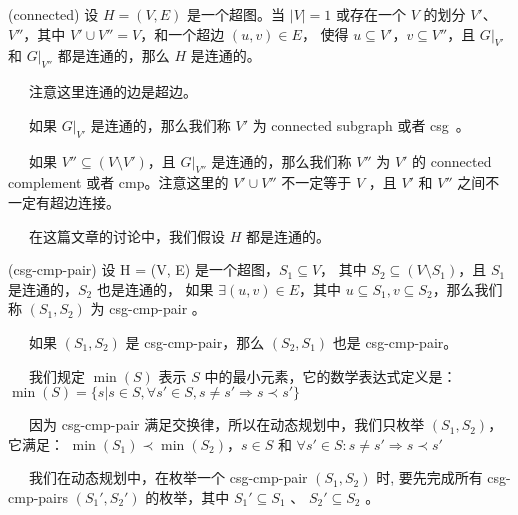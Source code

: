 \documentclass[fontset=none]{ctexart}
\begin{document}
\begin{definition}{(connected)}
    设 $H = (V, E)$ 是一个超图。当 $|V| = 1$ 或存在一个 $V$ 的划分 $V'$、$V''$，其中 $V' \cup V'' = V$，和一个超边 $(u, v) \in E$，
    使得 $u \subseteq V'$，$v \subseteq V''$，且 $G|_{V'}$ 和 $G|_{V''}$ 都是连通的，那么 $H$ 是连通的。

    \ \ \ 注意这里连通的边是超边。

    \ \ \ 如果 $G|_{V'}$ 是连通的，那么我们称 $V'$ 为 connected subgraph 或者 csg\ 。

    \ \ \ 如果 $V'' \subseteq (V \setminus V')$，且 $G|_{V''}$ 是连通的，那么我们称 $V''$ 为 $V'$ 的 connected complement 或者 cmp。注意这里的 $V' \cup V''$ 不一定等于 $V$ ，且 $V'$ 和 $V''$ 之间不一定有超边连接。

    \ \ \ 在这篇文章的讨论中，我们假设 $H$ 都是连通的。
\end{definition}

\begin{definition}{(csg-cmp-pair)}
    设 H = (V, E) 是一个超图，$S_{1} \subseteq V$， 其中 $S_{2} \subseteq (V \setminus S_{1})$，且 $S_{1}$ 是连通的，$S_{2}$ 也是连通的，
    如果 $\exists (u,v) \in E$，其中 $u \subseteq S_{1},v \subseteq S_{2}$，那么我们称 $(S_{1},S_{2})$ 为 csg-cmp-pair 。

    \ \ \ 如果 $(S_{1},S_{2})$ 是 csg-cmp-pair，那么 $(S_{2},S_{1})$ 也是 csg-cmp-pair。
    
    \ \ \ 我们规定 $\min(S)$ 表示 $S$ 中的最小元素，它的数学表达式定义是：$\min(S) = \{s | s \in S, \forall s' \in S, s \neq s' \Rightarrow s \prec s'\}$

    
    \ \ \ 因为 csg-cmp-pair 满足交换律，所以在动态规划中，我们只枚举 $(S_{1},S_{2})$，它满足：
    $\min(S_{1}) \prec \min(S_{2})$，$s \in S \text{ 和 } \forall s' \in S : s \neq s' \Rightarrow s \prec s'$

    \ \ \ 我们在动态规划中，在枚举一个 csg-cmp-pair $(S_{1},S_{2})$ 时, 要先完成所有 csg-cmp-pairs $(S_{1}',S_{2}')$ 的枚举，其中 $S_{1}' \subseteq S_{1}$ 、 $S_{2}' \subseteq S_{2}$ 。
\end{definition}
\end{document}
